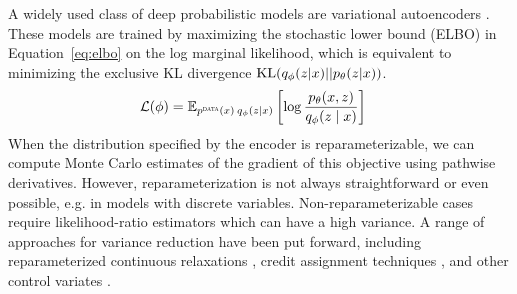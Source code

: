 \documentclass{article}
\theoremstyle{definition}
\begin{document}
A widely used class of deep probabilistic models are variational autoencoders \cite{kingma2013auto-encoding, rezende2014stochastic}.
These models are trained by maximizing the stochastic lower bound (ELBO) in Equation~\ref{eq:elbo} on the log marginal likelihood, which is equivalent to minimizing the exclusive KL divergence $\mathrm{KL}(q_\phi(z | x) || p_\theta(z | x))$. 
\begin{align}
    \label{eq:elbo}
    \mathcal{L} (\phi)
    &
    = 
    \mathbb{E}_{p^\textsc{data}(x) \: q_\phi(z \mid x)}
    \left[
       \log \frac{p_\theta(x, z)}{q_\phi(z \mid x)}
    \right] 
\end{align}
When the distribution specified by the encoder is reparameterizable, we can compute Monte Carlo estimates of the gradient of this objective using pathwise derivatives. However, reparameterization is not always straightforward or even possible, e.g. in models with discrete variables. Non-reparameterizable cases require likelihood-ratio estimators  \cite{williams1992simple} %
which can have a high variance. A range of approaches for variance reduction have been put forward, including reparameterized continuous relaxations \cite{maddison2017concrete,jang2017categorical}, credit assignment techniques \cite{weber2019credit}, and other control variates \cite{mnih2016variational,tucker2017rebar,grathwohl2018backpropagation}. 
\end{document}
